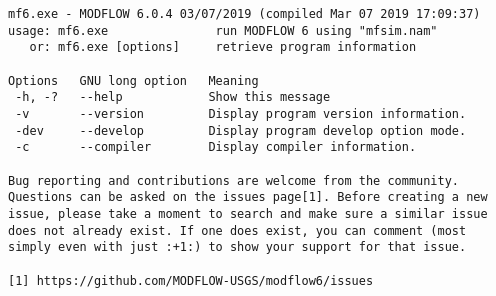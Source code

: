 {\small
\begin{lstlisting}[style=modeloutput]
mf6.exe - MODFLOW 6.0.4 03/07/2019 (compiled Mar 07 2019 17:09:37)
usage: mf6.exe               run MODFLOW 6 using "mfsim.nam"
   or: mf6.exe [options]     retrieve program information

Options   GNU long option   Meaning
 -h, -?   --help            Show this message
 -v       --version         Display program version information.
 -dev     --develop         Display program develop option mode.
 -c       --compiler        Display compiler information.

Bug reporting and contributions are welcome from the community.
Questions can be asked on the issues page[1]. Before creating a new
issue, please take a moment to search and make sure a similar issue
does not already exist. If one does exist, you can comment (most
simply even with just :+1:) to show your support for that issue.

[1] https://github.com/MODFLOW-USGS/modflow6/issues


\end{lstlisting}
}
